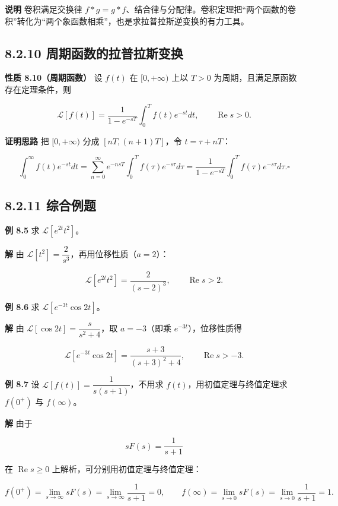 \textbf{说明} 卷积满足交换律
\(f*g=g*f\)、结合律与分配律。卷积定理把``两个函数的卷积''转化为``两个象函数相乘''，也是求拉普拉斯逆变换的有力工具。

\subsection{8.2.10
周期函数的拉普拉斯变换}\label{ux5468ux671fux51fdux6570ux7684ux62c9ux666eux62c9ux65afux53d8ux6362}

\textbf{性质 8.10（周期函数）} 设 \(f(t)\) 在 \([0,+\infty)\) 上以
\(T>0\) 为周期，且满足原函数存在定理条件，则

\[
\mathcal{L}[f(t)]=\frac{1}{1-e^{-sT}}\int_0^{T}f(t)e^{-st}dt,\qquad \operatorname{Re}s>0 .
\]

\textbf{证明思路} 把 \([0,+\infty)\) 分成 \([nT,(n+1)T]\)，令
\(t=\tau+nT\)：

\[
\int_0^{\infty}f(t)e^{-st}dt=\sum_{n=0}^{\infty}e^{-nsT}\int_0^{T}f(\tau)e^{-s\tau}d\tau
=\frac{1}{1-e^{-sT}}\int_0^{T}f(\tau)e^{-s\tau}d\tau . \square
\]

\subsection{8.2.11 综合例题}\label{ux7efcux5408ux4f8bux9898}

\textbf{例 8.5} 求 \(\mathcal{L}[e^{2t}t^2]\)。

\textbf{解} 由
\(\mathcal{L}[t^2]=\dfrac{2}{s^3}\)，再用位移性质（\(a=2\)）：

\[
\mathcal{L}[e^{2t}t^2]=\frac{2}{(s-2)^3},\qquad \operatorname{Re}s>2 .
\]

\textbf{例 8.6} 求 \(\mathcal{L}[e^{-3t}\cos 2t]\)。

\textbf{解} 由 \(\mathcal{L}[\cos 2t]=\dfrac{s}{s^2+4}\)，取
\(a=-3\)（即乘 \(e^{-3t}\)），位移性质得

\[
\mathcal{L}[e^{-3t}\cos 2t]=\frac{s+3}{(s+3)^2+4},\qquad \operatorname{Re}s>-3 .
\]

\textbf{例 8.7} 设 \(\mathcal{L}[f(t)]=\dfrac{1}{s(s+1)}\)，不用求
\(f(t)\)，用初值定理与终值定理求 \(f(0^+)\) 与 \(f(\infty)\)。

\textbf{解} 由于

\[
sF(s)=\frac{1}{s+1}
\]

在 \(\operatorname{Re}s\ge 0\) 上解析，可分别用初值定理与终值定理：

\[
f(0^+)=\lim_{s\to\infty}sF(s)=\lim_{s\to\infty}\frac{1}{s+1}=0,\qquad
f(\infty)=\lim_{s\to 0}sF(s)=\lim_{s\to 0}\frac{1}{s+1}=1 .
\]

